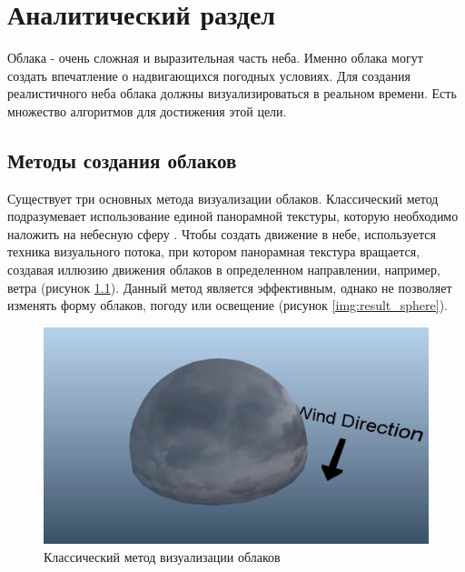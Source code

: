 \chapter{Аналитический раздел}
\label{cha:analysis}

Облака - очень сложная и выразительная часть неба. Именно облака могут создать впечатление
о надвигающихся погодных условиях.
Для создания реалистичного неба облака должны визуализироваться в реальном времени.
Есть множество алгоритмов для достижения этой цели.

\section{Методы создания облаков}

Существует три основных метода визуализации облаков. Классический метод подразумевает использование единой панорамной текстуры,
которую необходимо наложить на небесную сферу \cite{Gue14}. Чтобы создать движение в небе, используется техника визуального
потока, при котором панорамная текстура вращается, создавая иллюзию движения облаков в определенном направлении, например,
ветра (рисунок \ref{img:cloud_sphere}). Данный метод является эффективным, однако не позволяет изменять форму облаков, погоду или освещение
(рисунок \ref{img:result_sphere}).

\begin{figure}[H]
    \centering
    \includegraphics[scale=0.4]{img/cloud_sphere.png}
    \caption{Классический метод визуализации облаков}
    \label{img:cloud_sphere}
\end{figure}

